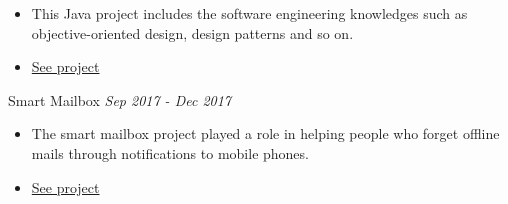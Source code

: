 \documentclass[10pt]{article}
\newenvironment{changemargin}[2]{
  \begin{list}{}{
    \setlength{\topsep}{0pt}
    \setlength{\leftmargin}{#1}
    \setlength{\rightmargin}{#2}
    \setlength{\listparindent}{\parindent}
    \setlength{\itemindent}{\parindent}
    \setlength{\parsep}{\parskip}
  }
  \item[]}{\end{list}
}
\newcommand{\project}[2]{
	{#1} \hfill \emph{#2}\\ \medskip
}
\newenvironment{body} {
	\vspace*{-16pt}
	\begin{changemargin}{-0.25in}{-0.5in}
  }
	{\end{changemargin}
}
\begin{document}
\begin{body}
\begin{itemize} \itemsep -0pt  %
      \item  This Java project includes the software engineering knowledges such as objective-oriented design, design patterns and so on.
      \item \href{https://github.com/jeongwhanchoi/helicopter_battle}{See project}
  	\end{itemize}
\project{Smart Mailbox}{Sep 2017 - Dec 2017}
\begin{itemize} \itemsep -0pt  %
      \item  The smart mailbox project played a role in helping people who forget offline mails through notifications to mobile phones.
      \item \href{https://github.com/jeongwhanchoi/Smart-Mailbox}{See project}
  	\end{itemize}	
\end{body}


\medskip
\end{document}
